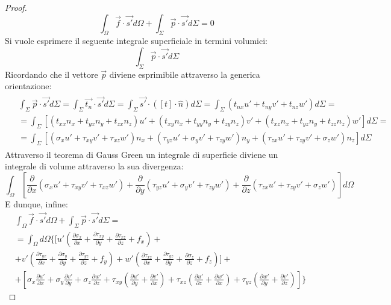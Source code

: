 \documentclass{article}
\begin{document}
\begin{adjustwidth}{2in}{}
\begin{proof}
	\[
	\int_{\Omega} \vec{f} \cdot \vec{s'} d\Omega + \int_{\Sigma}\vec{p} \cdot \vec{s'} d\Sigma =0
	\]
	Si vuole esprimere il seguente integrale superficiale in termini volumici:
	 \[
	 \int_{\Sigma}\vec{p} \cdot \vec{s'} d\Sigma
	 \]
	 Ricordando che il vettore $ \vec{p}$ diviene esprimibile attraverso la generica orientazione: 
	 \[
	 \begin{split}
	 	\begin{aligned}
	 	& \int_{\Sigma}\vec{p} \cdot \vec{s'} d\Sigma = \int_{\Sigma}\vec{t_n} \cdot \vec{s'} d\Sigma = \int_{\Sigma} \vec{s'} \cdot ([t] \cdot \hat{n})  d\Sigma = \int_{\Sigma}(t_{nx}u' + t_{ny} v' + t_{nz} w') d\Sigma = \\
	 	 & = \int_{\Sigma}	\left[ (t_{xx}n_x + t_{yx}n_y + t_{zx}n_z)u' + (t_{xy}n_x + t_{yy}n_y + t_{zy}n_z) v' + (t_{xz}n_x + t_{yz}n_y + t_{zz}n_z) w' \right]  d\Sigma = \\
	 	 & = \int_{\Sigma}	\left[ (\sigma_xu' + \tau_{xy}v' + \tau_{xz}w')n_x + (\tau_{yz}u' + \sigma_yv' + \tau_{zy}w')n_y + (\tau_{zx}u' + \tau_{zy}v' + \sigma_zw')n_z \right]  d\Sigma 
	 	 \end{aligned}
	 \end{split}
	 \]
	Attraverso il teorema di Gauss Green un integrale di superficie diviene un integrale di volume attraverso la sua divergenza:
	\[
	\int_{\Omega}	\left[ \dfrac{\partial}{\partial x}(\sigma_xu' + \tau_{xy}v' + \tau_{xz}w') + \dfrac{\partial}{\partial y}(\tau_{yz}u' + \sigma_yv' + \tau_{zy}w') + \dfrac{\partial}{\partial z}(\tau_{zx}u' + \tau_{zy}v' + \sigma_zw') \right]  d\Omega	
	\] 
	E dunque, infine: 
	\[
	\begin{split}	
	& \int_{\Omega} \vec{f} \cdot \vec{s'} d\Omega + \int_{\Sigma}\vec{p} \cdot \vec{s'} d\Sigma = \\
	& = \int_{\Omega} d\Omega \Biggl\{ \Bigg[u'\left( \frac{\partial \sigma_x}{\partial x} + \frac{\partial \tau_{xy}}{\partial y} + \frac{\partial \tau_{xz}}{\partial z} + f_x\right) + \\
	& + v'\left( \frac{\partial \tau_{yx}}{\partial x} + \frac{\partial \sigma_y}{\partial y} + \frac{\partial \tau_{yz}}{\partial z} + f_y\right) + w'\left( \frac{\partial \tau_{xz}}{\partial x} + \frac{\partial \tau_{yz}}{\partial y} + \frac{\partial \sigma_z}{\partial z} + f_z\right) \Bigg] +  \\
	& + \left[ \sigma_x \frac{\partial u'}{\partial x} + \sigma_y \frac{\partial v'}{\partial y} + \sigma_z \frac{\partial w'}{\partial z} + \tau_{xy} \left( \frac{\partial u'}{\partial y} + \frac{\partial v'}{\partial x}\right) + \tau_{xz} \left( \frac{\partial u'}{\partial z} + \frac{\partial w'}{\partial x}\right) + \tau_{yz} \left( \frac{\partial w'}{\partial y} + \frac{\partial v'}{\partial z}\right) \right]\Biggr\}	
	\end{split}
	\]
	

\end{proof}
\end{adjustwidth}
\end{document}
